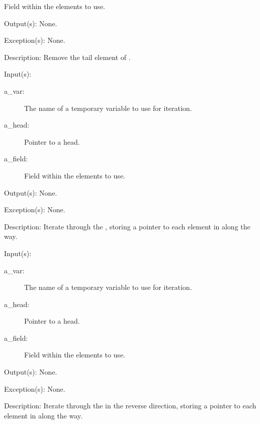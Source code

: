 \begin{capi}
\begin{capilist}
\begin{description}
			Field within the  elements to use.
		\end{description}
	\item[Output(s): ] None.
	\item[Exception(s): ] None.
	\item[Description: ]
		Remove the tail element of .
	\end{capilist}
\label{ql_foreach}
	\begin{capilist}
	\item[Input(s): ]
		\begin{description}\item[]
		\item[a\_var: ]
			The name of a temporary variable to use for iteration.
		\item[a\_head: ]
			Pointer to a  head.
		\item[a\_field: ]
			Field within the  elements to use.
		\end{description}
	\item[Output(s): ] None.
	\item[Exception(s): ] None.
	\item[Description: ]
		Iterate through the , storing a pointer to each
		element in  along the way.
	\end{capilist}
\label{ql_foreach_reverse}
	\begin{capilist}
	\item[Input(s): ]
		\begin{description}\item[]
		\item[a\_var: ]
			The name of a temporary variable to use for iteration.
		\item[a\_head: ]
			Pointer to a \classname{ql} head.
		\item[a\_field: ]
			Field within the  elements to use.
		\end{description}
	\item[Output(s): ] None.
	\item[Exception(s): ] None.
	\item[Description: ]
		Iterate through the  in the reverse direction,
		storing a pointer to each element in  along the
		way.
	\end{capilist}
\end{capi}
